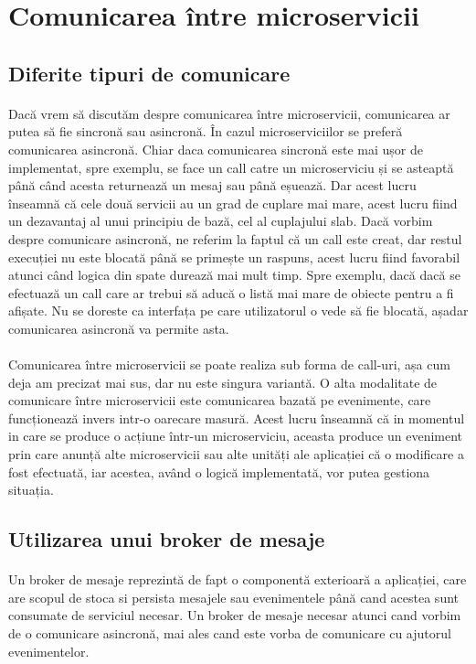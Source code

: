 \documentclass[12pt]{report}
\begin{document}
	\section{Comunicarea între microservicii}
		\subsection{Diferite tipuri de comunicare}
	\paragraph{}Dacă vrem să discutăm despre comunicarea între microservicii, comunicarea ar putea să fie sincronă sau asincronă. În cazul microserviciilor se preferă comunicarea asincronă. Chiar daca comunicarea sincronă este mai ușor de implementat, spre exemplu, se face un call catre un microserviciu și se asteaptă până când acesta returnează un mesaj sau până eșuează. Dar acest lucru înseamnă că cele două servicii au un grad de cuplare mai mare, acest lucru fiind un dezavantaj al unui principiu de bază, cel al cuplajului slab. Dacă vorbim despre comunicare asincronă, ne referim la faptul că un call este creat, dar restul execuției nu este blocată până se primește un raspuns, acest lucru fiind favorabil atunci când logica din spate durează mai mult timp. Spre exemplu, dacă dacă se efectuază un call care ar trebui să aducă o listă mai mare de obiecte pentru a fi afișate. Nu se doreste ca interfața pe care utilizatorul o vede să fie blocată, așadar comunicarea asincronă va permite asta.
	\paragraph{}Comunicarea între microservicii se poate realiza sub forma de call-uri, așa cum deja am precizat mai sus, dar nu este singura variantă. O alta modalitate de comunicare între microservicii este comunicarea bazată pe evenimente, care funcționează invers intr-o oarecare masură. Acest lucru înseamnă că in momentul in care se produce o acțiune într-un microserviciu, aceasta produce un eveniment prin care anunță alte microservicii sau alte unități ale aplicației că o modificare a fost efectuată, iar acestea, având o logică implementată, vor putea gestiona situația.
		\subsection{Utilizarea unui broker de mesaje}
	\paragraph{}Un broker de mesaje reprezintă de fapt o componentă exterioară a aplicației, care are scopul de stoca si persista mesajele sau evenimentele până cand acestea sunt consumate de serviciul necesar. Un broker de mesaje necesar atunci cand vorbim de o comunicare asincronă, mai ales cand este vorba de comunicare cu ajutorul evenimentelor.
\end{document}
